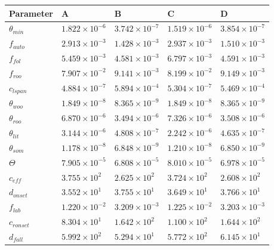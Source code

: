 \begin{table}[ht] 
\begin{center}
	\begin{tabular}{| l | l | l | l | l |}
	\hline
	Parameter & A & B & C & D \\ \hline
$\theta_{min}$ & $1.822\times 10^{-6}$ & $3.742\times 10^{-7}$ & $1.519\times 10^{-6}$ & $3.854\times 10^{-7}$ \\ \hline
$f_{auto}$ & $2.913\times 10^{-3}$ & $1.428\times 10^{-3}$ & $2.937\times 10^{-3}$ & $1.510\times 10^{-3}$ \\ \hline
$f_{fol}$ & $5.459\times 10^{-3}$ & $4.581\times 10^{-3}$ & $6.797\times 10^{-3}$ & $4.591\times 10^{-3}$ \\ \hline
$f_{roo}$ & $7.907\times 10^{-2}$ & $9.141\times 10^{-3}$ & $8.199\times 10^{-2}$ & $9.149\times 10^{-3}$ \\ \hline
$c_{lspan}$ & $4.884\times 10^{-7}$ & $5.894\times 10^{-4}$ & $5.304\times 10^{-7}$ & $5.469\times 10^{-4}$ \\ \hline
$\theta_{woo}$ & $1.849\times 10^{-8}$ & $8.365\times 10^{-9}$ & $1.849\times 10^{-8}$ & $8.365\times 10^{-9}$ \\ \hline
$\theta_{roo}$ & $6.870\times 10^{-6}$ & $3.494\times 10^{-6}$ & $7.326\times 10^{-6}$ & $3.508\times 10^{-6}$ \\ \hline
$\theta_{lit}$ & $3.144\times 10^{-6}$ & $4.808\times 10^{-7}$ & $2.242\times 10^{-6}$ & $4.635\times 10^{-7}$ \\ \hline
$\theta_{som}$ & $1.178\times 10^{-8}$ & $6.848\times 10^{-9}$ & $1.210\times 10^{-8}$ & $6.850\times 10^{-9}$ \\ \hline
$\Theta$ & $7.905\times 10^{-5}$ & $6.808\times 10^{-5}$ & $8.010\times 10^{-5}$ & $6.978\times 10^{-5}$ \\ \hline
$c_{eff}$ & $3.755\times 10^{2}$ & $2.625\times 10^{2}$ & $3.724\times 10^{2}$ & $2.608\times 10^{2}$ \\ \hline
$d_{onset}$ & $3.552\times 10^{1}$ & $3.755\times 10^{1}$ & $3.649\times 10^{1}$ & $3.766\times 10^{1}$ \\ \hline
$f_{lab}$ & $1.220\times 10^{-2}$ & $3.209\times 10^{-3}$ & $1.225\times 10^{-2}$ & $3.203\times 10^{-3}$ \\ \hline
$c_{ronset}$ & $8.304\times 10^{1}$ & $1.642\times 10^{2}$ & $1.100\times 10^{2}$ & $1.644\times 10^{2}$ \\ \hline
$d_{fall}$ & $5.992\times 10^{2}$ & $5.294\times 10^{1}$ & $5.772\times 10^{2}$ & $6.145\times 10^{1}$ \\ \hline

\end{tabular}
\end{center}
\end{table}
